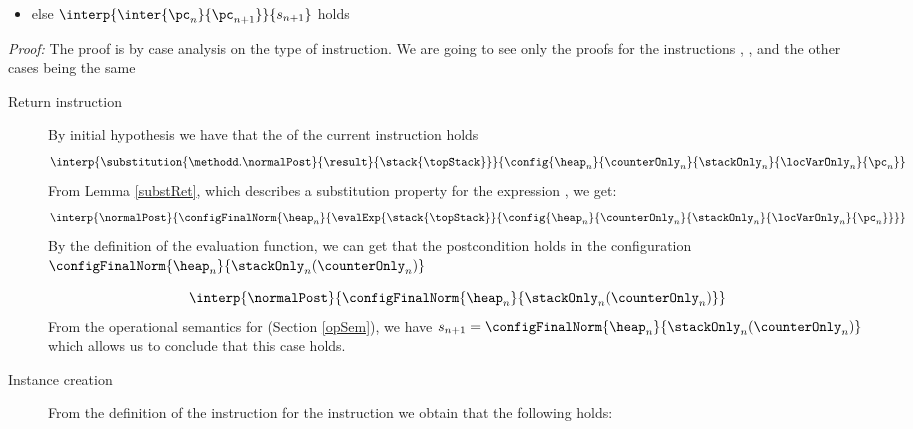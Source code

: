 \begin{lemma}
\begin{itemize}
       \item  else $ \interp{\inter{\pc_n}{\pc_{n+1}}}{s_{n+1}}  $   holds 
  \end{itemize} 
\end{lemma}
\textit{Proof:}
The proof is by case analysis on the type of instruction. %
We are going to see only the proofs for the instructions \return , \load, \new{} and \putfield{} the other cases being the same
\begin{description} 
		\item[ Return instruction]
		  By initial hypothesis we have that the \wpName{} of the current instruction holds
		 \begin{equation*}
          \interp {\substitution{ \methodd.\normalPost }{ \result }{\stack{\topStack} }}  { \config{\heap_n }{\counterOnly_n }{\stackOnly_n }{\locVarOnly_n }{\pc_n } }  
\end{equation*}
		 From Lemma \ref{substRet}, which describes a substitution property for the expression \result, we get:  
		  $$\interp { \normalPost} { \configFinalNorm{\heap_n  }
				                                   { \evalExp{ \stack{\topStack}}{\config{\heap_n }{\counterOnly_n }{\stackOnly_n }{\locVarOnly_n }{\pc_n } } }
                         }$$
			 By the definition of the evaluation function, we can get that the postcondition \normalPost{} 
			 holds in the configuration  $\configFinalNorm{\heap_n  }   { \stackOnly_n ( \counterOnly_n  )  }$
			
			 $$  \interp{ \normalPost} { \configFinalNorm{\heap_n  }  
							    { \stackOnly_n ( \counterOnly_n  )  } } $$
			From the operational semantics for \return (Section \ref{opSem}), we have $ s_{n+1} = \configFinalNorm{\heap_n  } { \stackOnly_n ( \counterOnly_n  )  }$
			which allows us to conclude that this case holds.
							    
	
			 
	\item [Instance creation]
	        From the definition of the \wpName{} instruction for the instruction \new{} we obtain that the following holds:
			 

\end{description}
